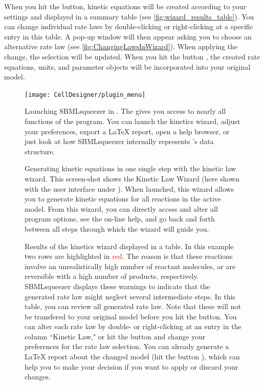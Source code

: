 When you hit the  button, kinetic equations will be created according to your settings and displayed in a summary table (see \vref{fig:wizard_results_table}).
You can change individual rate laws by double-clicking or right-clicking at a specific entry in this table.
A pop-up window will then appear asking you to choose an alternative rate law (see \vref{fig:ChangingLawsInWizard}).
When applying the change, the selection will be updated.
When you hit the button , the created rate equations, units, and parameter objects will be incorporated into your original model.

\begin{figure}
\texttt{[image: CellDesigner/plugin\_menu]}
\caption[Launching SBMLsqueezer in \CellDesigner]{Launching SBMLsqueezer in \CellDesigner.
The  gives you access to nearly all functions of the program.
You can launch the kinetics wizard, adjust your preferences, export a \LaTeX{} report, open a help browser, or just look at how SBMLsqueezer internally represents \CellDesigner's data structure.}
\label{fig:PluginMenu}
\end{figure}
\begin{figure}[t!]
\caption[Generating kinetic equations in one single step with the kinetic law wizard]{Generating kinetic equations in one single step with the kinetic law wizard.
This screen-shot shows the Kinetic Law Wizard (here shown with the user interface
under \MacOSX). When launched, this wizard allows you to generate kinetic equations for all reactions in the active model. From this wizard, you can directly access and alter all program options, see the on-line help, and go back and forth between all steps through which the wizard will guide you.}
\label{fig:KineticLawWizard}
\end{figure}
\begin{figure}
\caption[Results of the kinetics wizard displayed in a table]{Results of the kinetics wizard displayed in a table.
In this example two rows are highlighted in \textcolor{red}{red}.
The reason is that these reactions involve an unrealistically high number of reactant molecules, or are reversible with a high number of products, respectively.
SBMLsqueezer displays these warnings to indicate that the generated rate law might neglect several intermediate steps.
In this table, you can review all generated rate law.
Note that these will not be transfered to your original model before you hit the  button.
You can alter each rate law by double- or right-clicking at an entry in the column ``Kinetic Law," or hit the  button and change your preferences for the rate law selection.
You can already generate a \LaTeX{} report about the changed model (hit the button ), which can help you to make your decision if you want to apply or discard your changes.}
\label{fig:wizard_results_table}
\end{figure}
